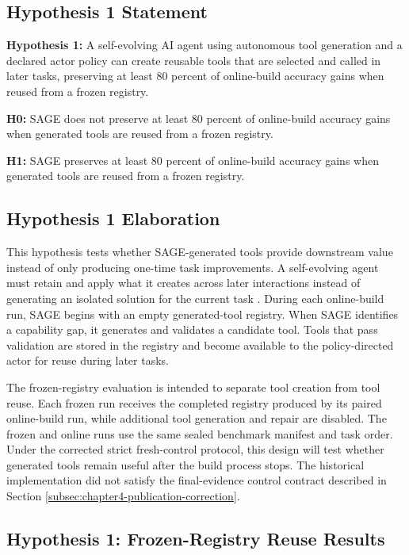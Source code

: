 \subsection{Hypothesis 1 Statement}
\label{subsec:h1-statement}

\textbf{Hypothesis 1:} A self-evolving AI agent using autonomous tool generation and a declared actor policy can create reusable tools that are selected and called in later tasks, preserving at least 80 percent of online-build accuracy gains when reused from a frozen registry.

\textbf{H0:} SAGE does not preserve at least 80 percent of online-build accuracy gains when generated tools are reused from a frozen registry.

\textbf{H1:} SAGE preserves at least 80 percent of online-build accuracy gains when generated tools are reused from a frozen registry.

\subsection{Hypothesis 1 Elaboration}
\label{subsec:h1-elaboration}

This hypothesis tests whether SAGE-generated tools provide downstream value instead of only producing one-time task improvements. A self-evolving agent must retain and apply what it creates across later interactions instead of generating an isolated solution for the current task \parencite{fang2025selfevolvingagentsurvey}. During each online-build run, SAGE begins with an empty generated-tool registry. When SAGE identifies a capability gap, it generates and validates a candidate tool. Tools that pass validation are stored in the registry and become available to the policy-directed actor for reuse during later tasks.

The frozen-registry evaluation is intended to separate tool creation from tool reuse. Each frozen run receives the completed registry produced by its paired online-build run, while additional tool generation and repair are disabled. The frozen and online runs use the same sealed benchmark manifest and task order. Under the corrected strict fresh-control protocol, this design will test whether generated tools remain useful after the build process stops. The historical implementation did not satisfy the final-evidence control contract described in Section \ref{subsec:chapter4-publication-correction}.

\subsection{Hypothesis 1: Frozen-Registry Reuse Results}
\label{subsec:h1-frozen-registry-results}

